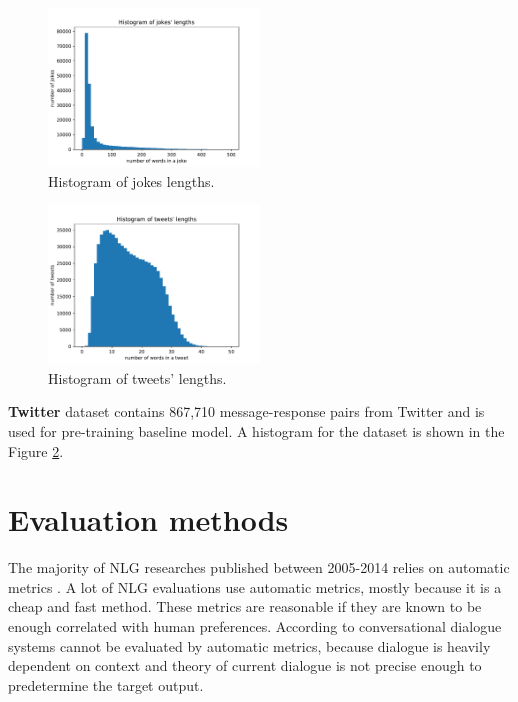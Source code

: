 \begin{figure}[H]
  \centering
  \includegraphics[width=0.5\textwidth]{figures/jokes.pdf}
  \caption{Histogram of jokes lengths.}
  \label{fig:jokes}
\end{figure}

\begin{figure}[H]
  \centering
  \includegraphics[width=0.5\textwidth]{figures/tweet.pdf}
  \caption{Histogram of tweets' lengths.}
  \label{fig:tweet}
\end{figure}

\textbf{Twitter} dataset contains 867,710 message-response pairs from Twitter and is used for pre-training baseline model. A histogram for the dataset is shown in the Figure \ref{fig:tweet}.

\section{Evaluation methods}\label{eval}
The majority of NLG researches published between 2005-2014 relies on automatic metrics \cite{gkatzia2015snapshot}. A lot of NLG evaluations use automatic metrics, mostly because it is a cheap and fast method. These metrics are reasonable if they are known to be enough correlated with human preferences. According to \cite{artstein2009semi} conversational dialogue systems cannot be evaluated by automatic metrics, because dialogue is heavily dependent on context and theory of current dialogue is not precise enough to predetermine the target output.  

